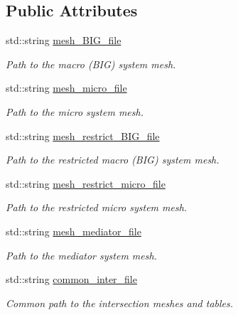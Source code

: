 \subsection*{Public Attributes}
\begin{DoxyCompactItemize}
\item 
std\+::string \hyperlink{structcarl_1_1coupling__assemble__coupling__input__params_af311a867cd2103103da6f37851832d18}{mesh\+\_\+\+B\+I\+G\+\_\+file}
\begin{DoxyCompactList}\small\item\em Path to the macro (B\+I\+G) system mesh. \end{DoxyCompactList}\item 
std\+::string \hyperlink{structcarl_1_1coupling__assemble__coupling__input__params_a704cd64a2a6e9c980a46130bc9ec921b}{mesh\+\_\+micro\+\_\+file}
\begin{DoxyCompactList}\small\item\em Path to the micro system mesh. \end{DoxyCompactList}\item 
std\+::string \hyperlink{structcarl_1_1coupling__assemble__coupling__input__params_ad2f08c3035377449238a1d830c666630}{mesh\+\_\+restrict\+\_\+\+B\+I\+G\+\_\+file}
\begin{DoxyCompactList}\small\item\em Path to the restricted macro (B\+I\+G) system mesh. \end{DoxyCompactList}\item 
std\+::string \hyperlink{structcarl_1_1coupling__assemble__coupling__input__params_ab73f9619bf9653bd3ed2cd019dff5f04}{mesh\+\_\+restrict\+\_\+micro\+\_\+file}
\begin{DoxyCompactList}\small\item\em Path to the restricted micro system mesh. \end{DoxyCompactList}\item 
std\+::string \hyperlink{structcarl_1_1coupling__assemble__coupling__input__params_a4fa79c1dc75b71bbda8e54d351ede2d2}{mesh\+\_\+mediator\+\_\+file}
\begin{DoxyCompactList}\small\item\em Path to the mediator system mesh. \end{DoxyCompactList}\item 
std\+::string \hyperlink{structcarl_1_1coupling__assemble__coupling__input__params_aa922a4b0252168abcfd52a9eb3e2b796}{common\+\_\+inter\+\_\+file}
\begin{DoxyCompactList}\small\item\em Common path to the intersection meshes and tables. \end{DoxyCompactList}\item 

\end{DoxyCompactItemize}
